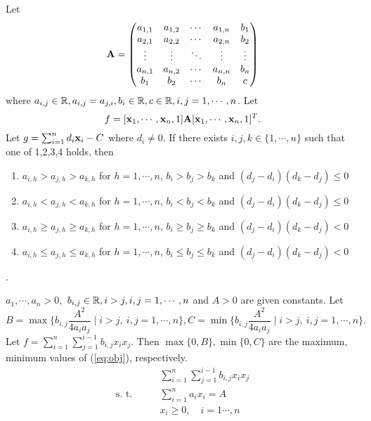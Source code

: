 \documentclass{llncs}
\begin{document}
\begin{theorem}
	Let 
\[\AA = 
\begin{pmatrix}
	a_{1,1} & a_{1,2} & \cdots & a_{1,n}& b_1 \\
	a_{2,1} & a_{2,2} & \cdots & a_{2,n}& b_2 \\
	\vdots  & \vdots  & \ddots & \vdots & \vdots \\
	a_{n,1} & a_{n,2} & \cdots & a_{n,n}& b_n  \\
	b_1     &  b_2    &  \cdots&   b_n  & c
\end{pmatrix}\]
where $a_{i,j} \in \RR, a_{i,j}=a_{j,i}, b_i\in \RR, c\in \RR, i,j=1,\cdots, n $. Let \[f=[\xx_1,\cdots, \xx_n,1]\AA[\xx_1,\cdots, \xx_n, 1]^T.\] Let $g=\sum_{i=1}^nd_i\xx_i-C$ where $d_i\neq 0$. If there exists $i,j,k\in \{1,\cdots, n\}$ such that
one of 1,2,3,4 holds, then 
\begin{enumerate}
		\item  $a_{i,h}>a_{j,h}>a_{k,h}$ for $h=1,\cdots, n$, $b_{i}>b_{j}>b_{k}$ and $(d_j-d_i)(d_k-d_j)\le 0$
		\item  $a_{i,h}<a_{j,h}<a_{k,h}$ for $h=1,\cdots, n$, $b_{i}<b_{j}<b_{k}$ and $(d_j-d_i)(d_k-d_j)\le 0$
		\item  $a_{i,h}\ge a_{j,h}\ge a_{k,h}$ for $h=1,\cdots, n$, $b_{i}\ge b_{j}\ge b_{k}$ and $(d_j-d_i)(d_k-d_j)< 0$
		\item  $a_{i,h}\le a_{j,h}\le a_{k,h}$ for $h=1,\cdots, n$, $b_{i}\le b_{j}\le b_{k}$ and $(d_j-d_i)(d_k-d_j)< 0$
\end{enumerate}

.


  $a_1,\cdots,a_n>0,$ $b_{i,j}\in \RR, i> j, i,j =1,\cdots, n$
	and $A>0$ are given constants.   Let \[
	 B=\max\{b_{i,j}\frac{A^2}{4a_{i}a_{j}}  \mid i> j,\ i,j=1,\cdots,n \}, C=\min\{b_{i,j}\frac{A^2}{4a_{i}a_{j}}  \mid i> j,\ i,j=1,\cdots,n \}.\]  
	 Let $f=\sum_{i=1}^n\sum_{j=1}^{i-1}b_{i,j}x_{i}x_{j}$.
	 Then $ \max\{0,B\}, \min\{0,C\}$ are the maximum, minimum values of (\ref{eq:obj}), respectively.
	 	\begin{align}
	 	&\sum_{i=1}^n\sum_{j=1}^{i-1}b_{i,j}x_{i}x_{j}  \label{eq:obj}\\
	 	\mbox{s.\ t.}\qquad	&\sum_{i=1}^na_ix_i=A \nonumber\\
	 	& x_i\ge 0,\quad i=1\cdots,n \nonumber
	 	\end{align}
%	 	
\end{theorem}
\end{document}
